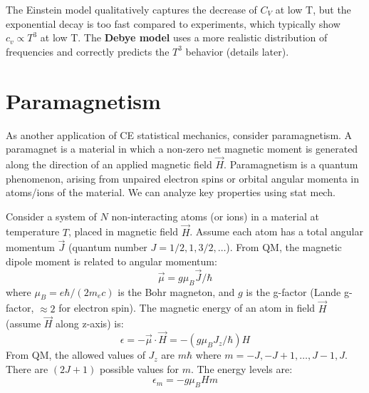 \documentclass[11pt]{article}
\newcommand{\muB}{\mu_B} %
\begin{document}
The Einstein model qualitatively captures the decrease of $C_V$ at low T, but the exponential decay is too fast compared to experiments, which typically show $c_v \propto T^3$ at low T. The \textbf{Debye model} uses a more realistic distribution of frequencies and correctly predicts the $T^3$ behavior (details later).

\begin{center}
\end{center}

\section*{Paramagnetism}

As another application of CE statistical mechanics, consider paramagnetism.
A paramagnet is a material in which a non-zero net magnetic moment is generated along the direction of an applied magnetic field $\vec{H}$.
Paramagnetism is a quantum phenomenon, arising from unpaired electron spins or orbital angular momenta in atoms/ions of the material. We can analyze key properties using stat mech.

Consider a system of $N$ non-interacting atoms (or ions) in a material at temperature $T$, placed in magnetic field $\vec{H}$. Assume each atom has a total angular momentum $\vec{J}$ (quantum number $J = 1/2, 1, 3/2, \dots$).
From QM, the magnetic dipole moment is related to angular momentum:
\[ \vec{\mu} = g \muB \vec{J}/\hbar \]
where $\muB = e\hbar/(2m_e c)$ is the Bohr magneton, and $g$ is the g-factor (Lande g-factor, $\approx 2$ for electron spin).
The magnetic energy of an atom in field $\vec{H}$ (assume $\vec{H}$ along z-axis) is:
\[ \epsilon = -\vec{\mu} \cdot \vec{H} = -(g \muB J_z/\hbar) H \]
From QM, the allowed values of $J_z$ are $m\hbar$ where $m = -J, -J+1, \dots, J-1, J$. There are $(2J+1)$ possible values for $m$.
The energy levels are:
\[ \epsilon_m = -g \muB H m \]
\end{document}
